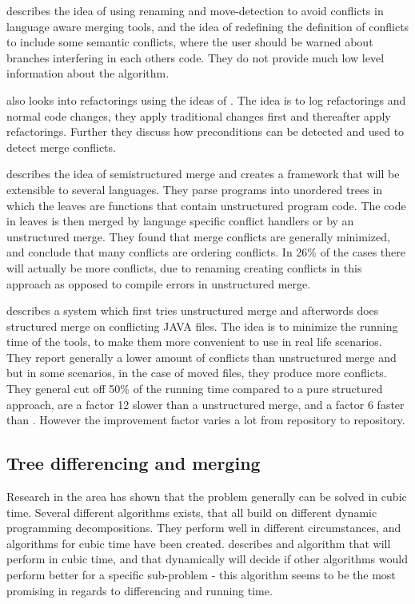 \documentclass[11pt]{article}
\begin{document}
\citet{Hunt} describes the idea of using renaming and move-detection to avoid conflicts in language aware merging tools, and the idea of redefining the definition of conflicts to include some semantic conflicts, where the user should be warned about branches interfering in each others code. They do not provide much low level information about the algorithm.

\citet{Ekman} also looks into refactorings using the ideas of \citet{Lippe}. The idea is to log refactorings and normal code changes, they apply traditional changes first and thereafter apply refactorings. Further they discuss how preconditions can be detected and used to detect merge conflicts.

\citet{Apel} describes the idea of semistructured merge and creates a framework that will be extensible to several languages. They parse programs into unordered trees in which the leaves are functions that contain unstructured program code. The code in leaves is then merged by language specific conflict handlers or by an unstructured merge. They found that merge conflicts are generally minimized, and conclude that many conflicts are ordering conflicts. In 26\% of the cases there will actually be more conflicts, due to renaming creating conflicts in this approach as opposed to compile errors in unstructured merge.

\citet{Olav} describes a system which first tries unstructured merge and afterwords does structured merge on conflicting JAVA files. The idea is to minimize the running time of the tools, to make them more convenient to use in real life scenarios. They report generally a lower amount of conflicts than unstructured merge and \citet{Apel} but in some scenarios, in the case of moved files, they produce more conflicts. They general cut off 50\% of the running time compared to a pure structured approach, are a factor 12 slower than a unstructured merge, and a factor 6 faster than \citet{Apel}. However the improvement factor varies a lot from repository to repository. 


\subsection{Tree differencing  and merging}
Research in the area has shown that the problem generally can be solved in cubic time. Several different algorithms exists, that all build on different dynamic programming decompositions. They perform well in different circumstances, and algorithms for cubic time have been created. \citet{Pawlik} describes and algorithm that will perform in cubic time, and that dynamically will decide if other algorithms would perform better for a specific sub-problem - this algorithm seems to be the most promising in regards to differencing and running time.
\end{document}
